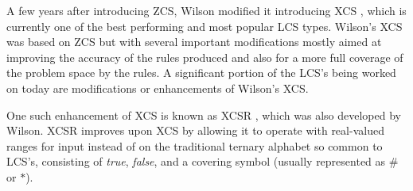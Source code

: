 A few years after introducing ZCS, Wilson modified it introducing XCS \cite{Wilson1995XCS}, which is currently one of the best performing and most popular LCS types.
Wilson's XCS was based on ZCS but with several important modifications mostly aimed at improving the accuracy of the rules produced and also for a more full coverage of the problem space by the rules.
A significant portion of the LCS's being worked on today are modifications or enhancements of Wilson's XCS.

One such enhancement of XCS is known as XCSR \cite{WilsonXCSR}, which was also developed by Wilson.
XCSR improves upon XCS by allowing it to operate with real-valued ranges for input instead of on the traditional ternary alphabet so common to LCS's, consisting of \emph{true}, \emph{false}, and a covering symbol (usually represented as $\#$ or $*$).


